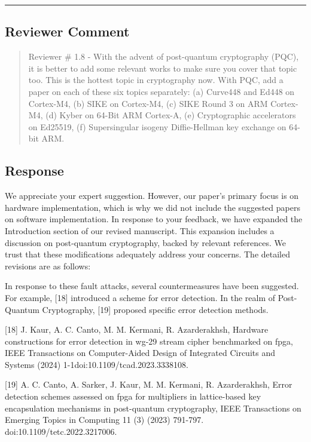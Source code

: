 \color{black}

\noindent\rule{\linewidth}{2.0pt}

\subsection{Reviewer Comment}
\begin{mdframed}
	\begin{quote}
		Reviewer \# 1.8 - With the advent of post-quantum cryptography (PQC), it is better to add some relevant works to make sure you cover that topic too. This is the hottest topic in cryptography now. With PQC, add a paper on each of these six topics separately: (a) Curve448 and Ed448 on Cortex-M4, (b) SIKE on Cortex-M4, (c) SIKE Round 3 on ARM Cortex-M4, (d) Kyber on 64-Bit ARM Cortex-A, (e) Cryptographic accelerators on Ed25519, (f) Supersingular isogeny Diffie-Hellman key exchange on 64-bit ARM.
	\end{quote}
\end{mdframed}

\subsection{Response}


We appreciate your expert suggestion. However, our paper's primary focus is on hardware implementation, which is why we did not include the suggested papers on software implementation. In response to your feedback, we have expanded the Introduction section of our revised manuscript. This expansion includes a discussion on post-quantum cryptography, backed by relevant references. We trust that these modifications adequately address your concerns. The detailed revisions are as follows:

\color{blue}

In response to these fault attacks, several countermeasures have been suggested. For example, [18] introduced a scheme for error detection. In the realm of Post-Quantum Cryptography, [19] proposed specific error detection methods.

[18] J. Kaur, A. C. Canto, M. M. Kermani, R. Azarderakhsh, Hardware constructions for error detection in wg-29 stream cipher benchmarked on fpga, IEEE Transactions on Computer-Aided Design of Integrated Circuits and Systems (2024) 1-1doi:10.1109/tcad.2023.3338108.

[19] A. C. Canto, A. Sarker, J. Kaur, M. M. Kermani, R. Azarderakhsh, Error detection schemes assessed on fpga for multipliers in lattice-based key encapsulation mechanisms in post-quantum cryptography, IEEE Transactions on Emerging Topics in Computing 11 (3) (2023) 791-797. doi:10.1109/tetc.2022.3217006.

